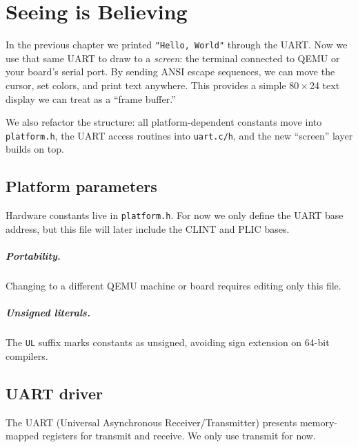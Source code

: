 \chapter{Seeing is Believing}

In the previous chapter we printed \texttt{"Hello, World"} through the UART.  
Now we use that same UART to draw to a \emph{screen}: the terminal connected to QEMU or your board’s serial port.  
By sending ANSI escape sequences, we can move the cursor, set colors, and print text anywhere.  
This provides a simple 80\,$\times$\,24 text display we can treat as a “frame buffer.”

We also refactor the structure: all platform-dependent constants move into \texttt{platform.h},  
the UART access routines into \texttt{uart.c/h}, and the new “screen” layer builds on top.

\section*{Platform parameters}

Hardware constants live in \texttt{platform.h}.  
For now we only define the UART base address, but this file will later include the CLINT and PLIC bases.

\begin{figure}[htb]
\centering

\end{figure}

\paragraph{Portability.}
Changing to a different QEMU machine or board requires editing only this file.

\paragraph{Unsigned literals.}
The \texttt{UL} suffix marks constants as unsigned, avoiding sign extension on 64-bit compilers.

\section*{UART driver}

The UART (Universal Asynchronous Receiver/Transmitter) presents memory-mapped registers for transmit and receive.  
We only use transmit for now.

